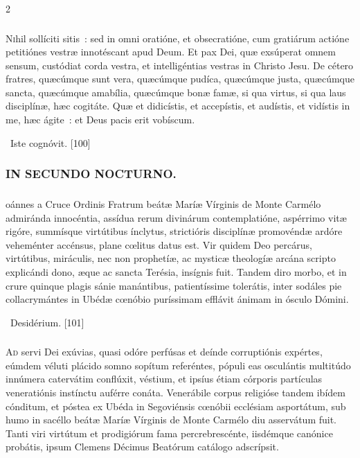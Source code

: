 \documentclass[9pt,twoside]{extarticle}
\begin{document}
\begin{multicols}{2}
{{\subsubsection*{\center {}}
\lettrine{N}ihil sollíciti sitis~: sed in omni oratióne, et obsecratióne, cum gratiárum actióne petitiónes vestræ innotéscant apud Deum.
Et pax Dei, quæ exsúperat omnem sensum, custódiat corda vestra, et intelligéntias vestras in Christo Jesu.
De cétero fratres, quæcúmque sunt vera, quæcúmque pudíca, quæcúmque justa, quæcúmque sancta, quæcúmque amabília, quæcúmque bonæ famæ, si qua virtus, si qua laus disciplínæ, hæc cogitáte.
Quæ et didicístis, et accepístis, et audístis, et vidístis in me, hæc ágite~: et Deus pacis erit vobíscum.

\begin{tightlist}{}
\item {}~Iste cognóvit. [100]
\end{tightlist}

\subsubsection*{\center \textsc{IN SECUNDO NOCTURNO.}}
\subsubsection*{\center {}}
oánnes a Cruce Ordinis Fratrum beátæ Maríæ Vírginis de Monte Carmélo admiránda innocéntia, assídua rerum divinárum contemplatióne, aspérrimo vitæ rigóre, summísque virtútibus ínclytus, strictióris disciplínæ promovéndæ ardóre veheménter accénsus, plane cœlitus datus est. Vir quidem Deo percárus, virtútibus, miráculis, nec non prophetíæ, ac mysticæ theologíæ arcána scripto explicándi dono, æque ac sancta Terésia, insígnis fuit. Tandem diro morbo, et in crure quinque plagis sánie manántibus, patientíssime tolerátis, inter sodáles pie collacrymántes in Ubédæ cœnóbio puríssimam efflávit ánimam in ósculo Dómini.

\begin{tightlist}{}
\item {}~Desidérium. [101]
\end{tightlist}

\subsubsection*{\center {}}
\lettrine{A}d servi Dei exúvias, quasi odóre perfúsas et deínde corruptiónis expértes, eúmdem véluti plácido somno sopítum referéntes, pópuli eas osculántis multitúdo innúmera catervátim conflúxit, véstium, et ipsíus étiam córporis partículas veneratiónis instínctu auférre conáta. Venerábile corpus religióse tandem ibídem cónditum, et póstea ex Ubéda in Segoviénsis cœnóbii ecclésiam asportátum, sub humo in sacéllo beátæ Maríæ Vírginis de Monte Carmélo diu asservátum fuit. Tanti viri virtútum et prodigiórum fama percrebrescénte, iisdémque canónice probátis, ipsum Clemens Décimus Beatórum catálogo adscrípsit.

}}
\end{multicols}
\end{document}

